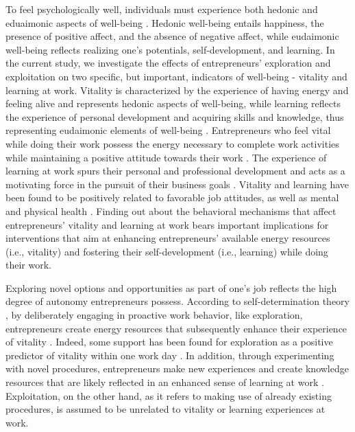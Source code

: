 \documentclass[man, 12pt, a4paper, noextraspace]{apa6}
\begin{document}
To feel psychologically well, individuals must experience both hedonic and eduaimonic aspects of well-being \parencite[e.g.,][]{Ryan.2001}. 
Hedonic well-being entails happiness, the presence of positive affect, and the absence of negative affect, while eudaimonic well-being reflects realizing one's potentials, self-development, and learning.
In the current study, we investigate the effects of entrepreneurs' exploration and exploitation on two specific, but important, indicators of well-being - vitality and learning at work. 
Vitality is characterized by the experience of having energy and feeling alive and represents hedonic aspects of well-being, while learning reflects the experience of personal development and acquiring skills and knowledge, thus representing eudaimonic elements of well-being \parencite{Spreitzer.2005b}. 
Entrepreneurs who feel vital while doing their work possess the energy necessary to complete work activities while maintaining a positive attitude towards their work \parencite{Ryan.1997}. 
The experience of learning at work spurs their personal and professional development and acts as a motivating force in the pursuit of their business goals \parencite{Jayawarna2013}. 
Vitality and learning have been found to be positively related to favorable job attitudes, as well as mental and physical health \parencite{Kleine.2019}.
Finding out about the behavioral mechanisms that affect entrepreneurs' vitality and learning at work bears important implications for interventions that aim at enhancing entrepreneurs' available energy resources (i.e., vitality) and fostering their self-development (i.e., learning) while doing their work. \par 

Exploring novel options and opportunities as part of one's job reflects the high degree of autonomy entrepreneurs possess.   
According to self-determination theory \parencite[SDT;][]{Ryan2001}, by deliberately engaging in proactive work behavior, like exploration, entrepreneurs create energy resources that subsequently enhance their experience of vitality \parencite{Spreitzer.2005b}.
Indeed, some support has been found for exploration as a positive predictor of vitality within one work day \textcite{Niessen.2012}.
In addition, through experimenting with novel procedures, entrepreneurs make new experiences and create knowledge resources that are likely reflected in an enhanced sense of learning at work \parencite[e.g.][]{Kolb2009, Spreitzer.2005b}.
Exploitation, on the other hand, as it refers to making use of already existing procedures, is assumed to be unrelated to vitality or learning experiences at work. \par 
\end{document}
